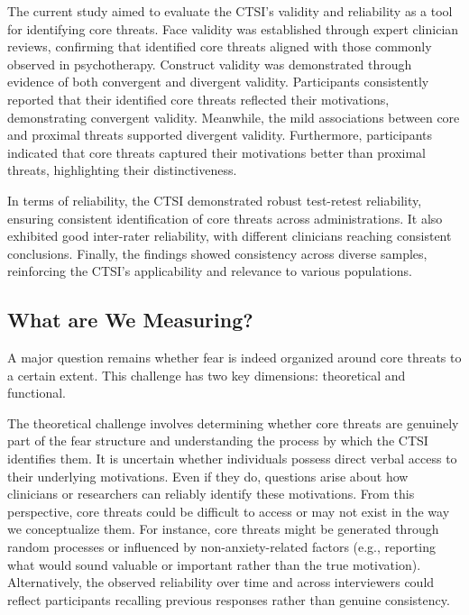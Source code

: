 \documentclass[
  man,floatsintext]{apa7}
\begin{document}
The current study aimed to evaluate the CTSI's validity and reliability as a tool for identifying core threats.
Face validity was established through expert clinician reviews, confirming that identified core threats aligned with those commonly observed in psychotherapy.
Construct validity was demonstrated through evidence of both convergent and divergent validity.
Participants consistently reported that their identified core threats reflected their motivations, demonstrating convergent validity.
Meanwhile, the mild associations between core and proximal threats supported divergent validity.
Furthermore, participants indicated that core threats captured their motivations better than proximal threats, highlighting their distinctiveness.

In terms of reliability, the CTSI demonstrated robust test-retest reliability, ensuring consistent identification of core threats across administrations.
It also exhibited good inter-rater reliability, with different clinicians reaching consistent conclusions.
Finally, the findings showed consistency across diverse samples, reinforcing the CTSI's applicability and relevance to various populations.

\subsection{What are We Measuring?}\label{what-are-we-measuring}

A major question remains whether fear is indeed organized around core threats to a certain extent.
This challenge has two key dimensions: theoretical and functional.

The theoretical challenge involves determining whether core threats are genuinely part of the fear structure and understanding the process by which the CTSI identifies them.
It is uncertain whether individuals possess direct verbal access to their underlying motivations.
Even if they do, questions arise about how clinicians or researchers can reliably identify these motivations.
From this perspective, core threats could be difficult to access or may not exist in the way we conceptualize them.
For instance, core threats might be generated through random processes or influenced by non-anxiety-related factors (e.g., reporting what would sound valuable or important rather than the true motivation).
Alternatively, the observed reliability over time and across interviewers could reflect participants recalling previous responses rather than genuine consistency.
\end{document}
